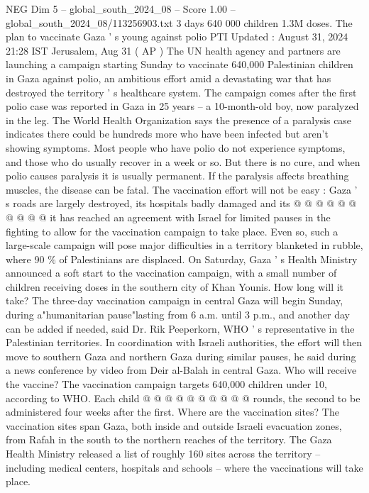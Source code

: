 \begin{textsample}{NEG Dim 5 – global\_south\_2024\_08 – Score 1.00 – global\_south\_2024\_08/113256903.txt}  \label{ex:f5_neg_129}
3 days 640 000 children 1.3M doses.
The plan to vaccinate Gaza ' s young against polio PTI Updated : August 31, 2024 21:28 IST Jerusalem, Aug 31 ( AP ) The UN health agency and partners are launching a campaign starting Sunday to vaccinate 640,000 Palestinian children in Gaza against polio, an ambitious effort amid a devastating war that has destroyed the territory ' s healthcare system.
The campaign comes after the first polio case was reported in Gaza in 25 years -- a 10-month-old boy, now paralyzed in the leg.
The World Health Organization says the presence of a paralysis case indicates there could be hundreds more who have been infected but aren't showing symptoms.
Most people who have polio do not experience symptoms, and those who do usually recover in a week or so.
But there is no cure, and when polio causes paralysis it is usually permanent.
If the paralysis affects breathing muscles, the disease can be fatal.
The vaccination effort will not be easy : Gaza ' s roads are largely destroyed, its hospitals badly damaged and its @ @ @ @ @ @ @ @ @ @ it has reached an agreement with Israel for limited pauses in the fighting to allow for the vaccination campaign to take place.
Even so, such a large-scale campaign will pose major difficulties in a territory blanketed in rubble, where 90 \% of Palestinians are displaced.
On Saturday, Gaza ' s Health Ministry announced a soft start to the vaccination campaign, with a small number of children receiving doses in the southern city of Khan Younis.
How long will it take?
The three-day vaccination campaign in central Gaza will begin Sunday, during a"humanitarian pause"lasting from 6 a.m. until 3 p.m., and another day can be added if needed, said Dr.
Rik Peeperkorn, WHO ' s representative in the Palestinian territories.
In coordination with Israeli authorities, the effort will then move to southern Gaza and northern Gaza during similar pauses, he said during a news conference by video from Deir al-Balah in central Gaza.
Who will receive the vaccine?
The vaccination campaign targets 640,000 children under 10, according to WHO.
Each child @ @ @ @ @ @ @ @ @ @ rounds, the second to be administered four weeks after the first.
Where are the vaccination sites?
The vaccination sites span Gaza, both inside and outside Israeli evacuation zones, from Rafah in the south to the northern reaches of the territory.
The Gaza Health Ministry released a list of roughly 160 sites across the territory -- including medical centers, hospitals and schools -- where the vaccinations will take place.

\end{textsample}
